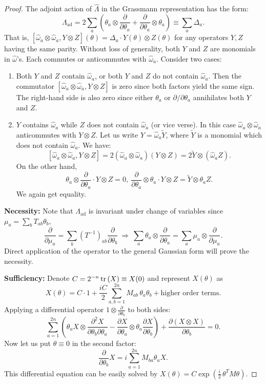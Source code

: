 \documentclass{SciPost}
\begin{document}
\begin{proof}
The adjoint action of $\hat \Lambda$ in the Grassmann representation has the form:
\begin{equation}
	\Lambda_\text{ad} = 2\sum_a\left(\theta_a\otimes \frac{\partial}{\partial\theta_a}+\frac{\partial}{\partial\theta_a}\otimes \theta_a\right) \equiv \sum_a \Delta_a.
\end{equation}
That is, $[\hat\omega_a\otimes \hat \omega_a, Y \otimes Z](\theta)= \Delta_a \cdot Y(\theta)\otimes Z(\theta)$ for any operators $Y,Z$ having the same parity. Without loss of generality, both $Y$ and $Z$ are monomials in $\hat\omega$'s. Each commutes or anticommutes with $\hat{\omega}_a$. Consider two cases:
\begin{enumerate}
	\item Both $Y$ and $Z$ contain $\hat{\omega}_a$, or both $Y$ and $Z$ do not contain $\hat{\omega}_a$. Then the commutator $[\hat{\omega}_a\otimes \hat{\omega}_a,Y\otimes Z]$ is zero since both factors yield the same sign. The right-hand side is also zero since either $\theta_a$ or $\partial/\partial{\theta_a}$ annihilates both $Y$ and $Z$.
	\item $Y$ contains $\hat{\omega}_a$ while $Z$ does not contain $\hat{\omega}_a$ (or vice verse). In this case $\hat{\omega}_a\otimes\hat{\omega}_a$ anticommutes with $Y\otimes Z$. Let us write $Y=\hat{\omega}_a \tilde{Y}$, where $\tilde{Y}$ is a monomial which does not contain $\hat{\omega}_a$. We have: $$[\hat{\omega}_a\otimes \hat{\omega}_a,Y\otimes Z]=2(\hat{\omega}_a\otimes \hat{\omega}_a)(Y\otimes Z) = 2\tilde{Y}\otimes(\hat{\omega}_a Z).$$ On the other hand, $$\theta_a\otimes \frac{\partial}{\partial\theta_a} \cdot Y \otimes Z =0,\ \frac{\partial}{\partial\theta_a}\otimes \theta_a \cdot Y\otimes Z = \tilde{Y}\otimes \theta_a Z.$$ We again get equality.
\end{enumerate}

\noindent\textbf{Necessity:}
Note that $\Lambda_\text{ad}$ is invariant under change of variables since $\mu_a = \sum_b T_{ab}\theta_b$,
$$
\frac{\partial}{\partial\mu_a} = \sum_b(T^{-1})_{ab}\frac{\partial}{\partial\theta_b} \ \Longrightarrow\ \sum_a \theta_a\otimes\frac{\partial}{\partial\theta_a} = \sum_a \mu_a\otimes\frac{\partial}{\partial\mu_a}.
$$
Direct application of the operator to the general Gaussian form will prove the necessity.

\noindent\textbf{Sufficiency:} Denote $C=2^{-n}\operatorname{tr}{(X)}\equiv X(0)$ and represent $X(\theta)$ as
$$X(\theta)= C\cdot 1 + \frac{iC}2\sum_{a,b=1}^{2n} M_{ab}\,\theta_a \theta_b + \mbox{higher order terms}.$$
Applying a differential operator $1\otimes \frac{\partial}{\partial\theta_b}$ to both sides:
$$
\sum_{a=1}^{2n} \left(\theta_a X \otimes \frac{\partial^2 X}{\partial \theta_b \partial \theta_a}  - \frac{\partial X}{\partial\theta_a}  \otimes \theta_a\frac{\partial X}{\partial\theta_b}  \right) + \frac{\partial(X \otimes X)}{\partial\theta_b}  = 0.
$$
Now let us put $\theta\equiv 0$ in the second factor:
$$
\frac{\partial}{\partial\theta_b} X = i\sum_{a=1}^{2n} M_{ba} \theta_a X.
$$
This differential equation can be easily solved by $X(\theta)=C \exp{\left( \frac{i}2\, \theta^T M \theta \right)}$. 


\end{proof}
\end{document}
